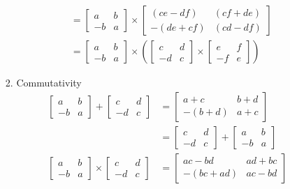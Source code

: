 \documentclass[letterpaper]{article}
\begin{document}
\begin{enumerate}
\begin{enumerate}
\begin{enumerate}
\begin{align*}
        &=\left[\begin{array}{rr}a&b\\-b&a\end{array}\right]
        \times\left[\begin{array}{rr}(ce-df)&(cf+de)\\-(de+cf)&(cd-df)\end{array}\right]\\
        &=\left[\begin{array}{rr}a&b\\-b&a\end{array}\right]
        \times\left(\left[\begin{array}{rr}c&d\\-d&c\end{array}\right]
        \times\left[\begin{array}{rr}e&f\\-f&e\end{array}\right]\right)
      \end{align*}
    \item
      Commutativity
      \begin{align*}
        \left[\begin{array}{rr}a&b\\-b&a\end{array}\right]
        +\left[\begin{array}{rr}c&d\\-d&c\end{array}\right]
        &=\left[\begin{array}{rr}a+c&b+d\\-(b+d)&a+c\end{array}\right]\\
        &=\left[\begin{array}{rr}c&d\\-d&c\end{array}\right]
        +\left[\begin{array}{rr}a&b\\-b&a\end{array}\right]\\
        \left[\begin{array}{rr}a&b\\-b&a\end{array}\right]
        \times\left[\begin{array}{rr}c&d\\-d&c\end{array}\right]
        &=\left[\begin{array}{rr}ac-bd&ad+bc\\-(bc+ad)&ac-bd\end{array}\right]\\

\end{align*}
\end{enumerate}
\end{enumerate}
\end{enumerate}
\end{document}
